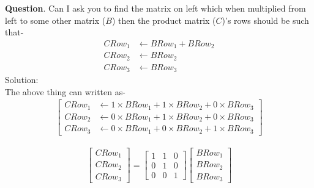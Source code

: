 \documentclass{article}
\begin{document}
    \textbf{Question}. Can I ask you to find the matrix on left which when multiplied from left to some other matrix ($B$) then the product matrix ($C$)'s rows should be such that-
\begin{align}
        CRow_1 &\leftarrow BRow_1 + BRow_2 \nonumber\\
        CRow_2 &\leftarrow BRow_2 \nonumber\\
        CRow_3 &\leftarrow BRow_3 \nonumber
\end{align}
Solution:\\
The above thing can written as-\\
\begin{align}
    \begin{bmatrix}
        CRow_1  &\leftarrow 1 \times BRow_1 + 1  \times BRow_2 + 0  \times BRow_3 \nonumber\\
        CRow_2 &\leftarrow 0 \times BRow_1 + 1  \times BRow_2 + 0  \times BRow_3 \nonumber\\
        CRow_3 &\leftarrow 0 \times BRow_1 + 0  \times BRow_2 + 1  \times BRow_3 \nonumber
    \end{bmatrix}
\end{align}

\begin{align}
 \begin{bmatrix}
        CRow_1\\
        CRow_2\\
        CRow_3
    \end{bmatrix} = 
    \begin{bmatrix}
        1 & 1 & 0\\
        0 & 1 & 0\\
        0 & 0 & 1
    \end{bmatrix}\begin{bmatrix}
                    BRow_1\\
                    BRow_2\\
                    BRow_3
                 \end{bmatrix} \nonumber
\end{align}
\end{document}
